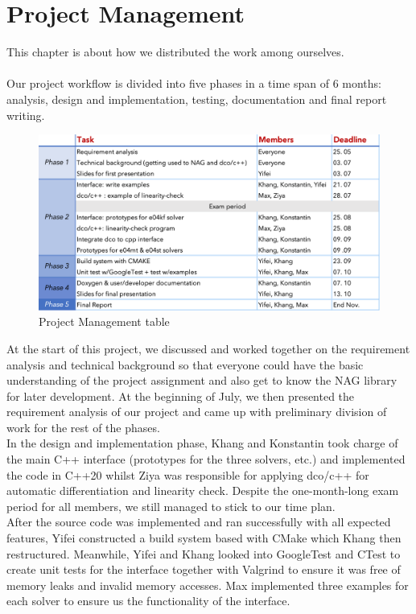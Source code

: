 \documentclass{book}
\begin{document}
\chapter{Project Management} \label{ch:projectmanagement}
This chapter is about how we distributed the work among ourselves. \\\\
Our project workflow is divided into five phases in a time span of 6 months: analysis, design and implementation, testing, documentation and final report writing. \\
\begin{figure}[h!]
\includegraphics[width=\textwidth]{proj_management.png}
\caption{\small Project Management table}
\end{figure}
\newline
At the start of this project, we discussed and worked together on the requirement analysis and technical background so that everyone could have the basic understanding of the project assignment and also get to know the NAG library for later development. At the beginning of July, we then presented the requirement analysis of our project and came up with preliminary division of work for the rest of the phases. \\
\newline
In the design and implementation phase, Khang and Konstantin took charge of the main C++ interface (prototypes for the three solvers, etc.) and implemented the code in C++20 whilst Ziya was responsible for applying dco/c++ for automatic differentiation and linearity check. Despite the one-month-long exam period for all members, we still managed to stick to our time plan. \\
\newline
After the source code was implemented and ran successfully with all expected features, Yifei constructed a build system based with CMake which Khang then restructured. Meanwhile, Yifei and Khang looked into GoogleTest and CTest to create unit tests for the interface together with Valgrind to ensure it was free of memory leaks and invalid memory accesses. Max implemented three examples for each solver to ensure us the functionality of the interface. \\
\end{document}

